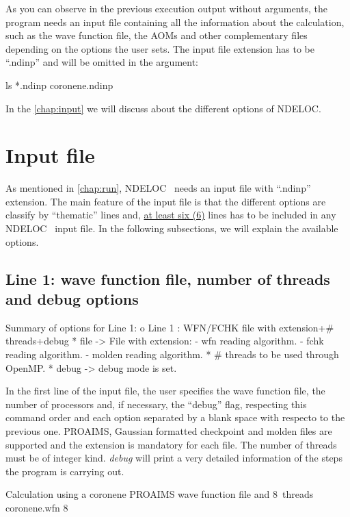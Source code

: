 \documentclass[a4paper,11pt,openany]{memoir}
\newcommand\programa{\textsc{NDELOC}}
\begin{document}
As you can observe in the previous execution output without arguments, the program needs an input file containing all the information about the calculation, such as the wave function file, the \acp{AOM} and other complementary files depending on the options the user sets. The input file extension has to be ``.ndinp'' and will be omitted in the argument:
\begin{consola}{ls *.ndinp}
coronene.ndinp
\end{consola}
In the \autoref{chap:input} we will discuss about the different options of \programa.

\chapter{Input file}\label{chap:input}
As mentioned in \autoref{chap:run}, \programa~ needs an input file with ``.ndinp'' extension. The main feature of the input file is that the different options are classify by ``thematic'' lines and, \underline{at least six (6)} lines has to be included in any \programa~ input file. In the following subsections, we will explain the available options.

\section{Line 1: wave function file, number of threads and debug options}\label{sec:line1}
\begin{recuadro}{Summary of options for Line 1:}
o Line 1 :  WFN/FCHK file with extension+# threads+debug
 *  file   -> File with extension:
  - wfn    reading algorithm.        
  - fchk   reading algorithm.        
  - molden reading algorithm.        
 *  # threads to be used through OpenMP.
 *  debug  -> debug mode is set.
\end{recuadro}
In the first line of the input file, the user specifies the wave function file, the number of processors and, if necessary, the ``debug'' flag, respecting this command order and each option separated by a blank space with respecto to the previous one. PROAIMS, Gaussian formatted checkpoint and molden files are supported and the extension is mandatory for each file. The number of threads must be of integer kind. \emph{debug} will print a very detailed information of the steps the program is carrying out.
\begin{myexample}{Calculation using a coronene PROAIMS wave function file and \SI{8}{threads}}
	coronene.wfn 8
\end{myexample}
\end{document}
